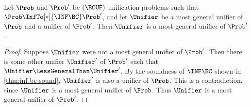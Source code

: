 \begin{Theorem}\label{thm:inf-bc-mgu-complete}
    Let $\Prob$ and $\Prob'$ be $(\BCUF)$-unification problems such that $\Prob
    \InfTo[*]{\INF\BC} \Prob'$, and let $\Unifier$ be a most general unifier of
    $\Prob$ and a unifier of $\Prob'$. Then $\Unifier$ is a most general
    unifier of $\Prob'$.
\end{Theorem}

\begin{proof}
    Suppose $\Unifier$ were not a most general unifier of $\Prob'$. Then there
    is some other unifier $\Unifier'$ of $\Prob'$ such that $\Unifier
    \LessGeneralThan \Unifier'$. By the soundness of $\INF\BC$ shown in
    \cref{thm:inf-bc-sound}, $\Unifier'$ is also a unifier of $\Prob$. This is
    a contradiction, since $\Unifier$ is a most general unifier of $\Prob$. Thus
    $\Unifier$ is a most general unifier of $\Prob'$.
\end{proof}

